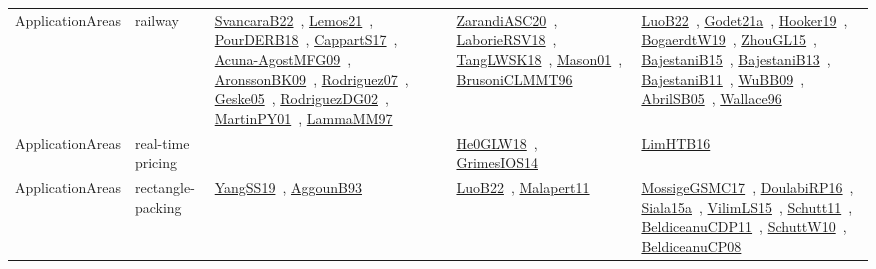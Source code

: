 {\begin{longtable}{lp{3cm}>{\raggedright\arraybackslash}p{6cm}>{\raggedright\arraybackslash}p{6cm}>{\raggedright\arraybackslash}p{8cm}}
ApplicationAreas & railway & \href{works/SvancaraB22.pdf}{SvancaraB22}~\cite{SvancaraB22}, \href{works/Lemos21.pdf}{Lemos21}~\cite{Lemos21}, \href{works/PourDERB18.pdf}{PourDERB18}~\cite{PourDERB18}, \href{works/CappartS17.pdf}{CappartS17}~\cite{CappartS17}, \href{works/Acuna-AgostMFG09.pdf}{Acuna-AgostMFG09}~\cite{Acuna-AgostMFG09}, \href{works/AronssonBK09.pdf}{AronssonBK09}~\cite{AronssonBK09}, \href{works/Rodriguez07.pdf}{Rodriguez07}~\cite{Rodriguez07}, \href{works/Geske05.pdf}{Geske05}~\cite{Geske05}, \href{works/RodriguezDG02.pdf}{RodriguezDG02}~\cite{RodriguezDG02}, \href{works/MartinPY01.pdf}{MartinPY01}~\cite{MartinPY01}, \href{works/LammaMM97.pdf}{LammaMM97}~\cite{LammaMM97} & \href{works/ZarandiASC20.pdf}{ZarandiASC20}~\cite{ZarandiASC20}, \href{works/LaborieRSV18.pdf}{LaborieRSV18}~\cite{LaborieRSV18}, \href{works/TangLWSK18.pdf}{TangLWSK18}~\cite{TangLWSK18}, \href{works/Mason01.pdf}{Mason01}~\cite{Mason01}, \href{works/BrusoniCLMMT96.pdf}{BrusoniCLMMT96}~\cite{BrusoniCLMMT96} & \href{works/LuoB22.pdf}{LuoB22}~\cite{LuoB22}, \href{works/Godet21a.pdf}{Godet21a}~\cite{Godet21a}, \href{works/Hooker19.pdf}{Hooker19}~\cite{Hooker19}, \href{works/BogaerdtW19.pdf}{BogaerdtW19}~\cite{BogaerdtW19}, \href{works/ZhouGL15.pdf}{ZhouGL15}~\cite{ZhouGL15}, \href{works/BajestaniB15.pdf}{BajestaniB15}~\cite{BajestaniB15}, \href{works/BajestaniB13.pdf}{BajestaniB13}~\cite{BajestaniB13}, \href{works/BajestaniB11.pdf}{BajestaniB11}~\cite{BajestaniB11}, \href{works/WuBB09.pdf}{WuBB09}~\cite{WuBB09}, \href{works/AbrilSB05.pdf}{AbrilSB05}~\cite{AbrilSB05}, \href{works/Wallace96.pdf}{Wallace96}~\cite{Wallace96}\\
ApplicationAreas & real-time pricing &  & \href{works/He0GLW18.pdf}{He0GLW18}~\cite{He0GLW18}, \href{works/GrimesIOS14.pdf}{GrimesIOS14}~\cite{GrimesIOS14} & \href{works/LimHTB16.pdf}{LimHTB16}~\cite{LimHTB16}\\
ApplicationAreas & rectangle-packing & \href{works/YangSS19.pdf}{YangSS19}~\cite{YangSS19}, \href{works/AggounB93.pdf}{AggounB93}~\cite{AggounB93} & \href{works/LuoB22.pdf}{LuoB22}~\cite{LuoB22}, \href{works/Malapert11.pdf}{Malapert11}~\cite{Malapert11} & \href{works/MossigeGSMC17.pdf}{MossigeGSMC17}~\cite{MossigeGSMC17}, \href{works/DoulabiRP16.pdf}{DoulabiRP16}~\cite{DoulabiRP16}, \href{works/Siala15a.pdf}{Siala15a}~\cite{Siala15a}, \href{works/VilimLS15.pdf}{VilimLS15}~\cite{VilimLS15}, \href{works/Schutt11.pdf}{Schutt11}~\cite{Schutt11}, \href{works/BeldiceanuCDP11.pdf}{BeldiceanuCDP11}~\cite{BeldiceanuCDP11}, \href{works/SchuttW10.pdf}{SchuttW10}~\cite{SchuttW10}, \href{works/BeldiceanuCP08.pdf}{BeldiceanuCP08}~\cite{BeldiceanuCP08}\\

\end{longtable}}
